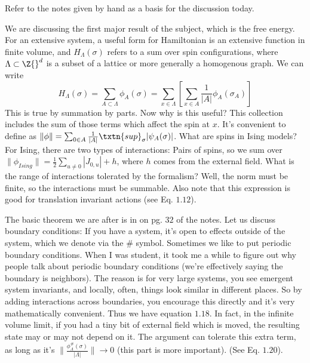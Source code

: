
Refer to the notes given by hand as a basis for the discussion today. 

We are discussing the first major result of the subject, which is the free energy. For an extensive system, a useful form for Hamiltonian is an extensive function in finite volume, and $H_{\Lambda}(\sigma)$ refers to a sum over spin configurations, where $\Lambda \subset \Z{}^d$ is a subset of a lattice or more generally a homogenous graph. We can write 
\[
H_{\Lambda}(\sigma) = \sum_{A \subset \Lambda} \phi_A(\sigma) = \sum_{x \in \Lambda}\left[\sum_{x \in A} \frac{1}{|A|}\phi_A(\sigma_A)\right]
\]
This is true by summation by parts.  Now why is this useful? This collection includes the sum of those terms which affect the spin at $x$. It's convenient to define as $\| \phi \| = \sum_{0 \in A} \frac{1}{|A|} \txtn{sup}_{\sigma} |\psi_A(\sigma)|$. What are spins in Ising models? For Ising, there are two types of interactions: Pairs of spins, so we sum over $\|\phi_{Ising}\| = \frac{1}{2}\sum_{u \neq 0} |J_{0, u}| + h$, where $h$ comes from the external field. What is the range of interactions tolerated by the formalism? Well, the norm must be finite, so the interactions must be summable. 
Also note that this expression is good for translation invariant actions (see Eq. $1.12$). 

The basic theorem we are after is in on pg. $32$ of the notes. Let us discuss boundary conditions: If you have a system, it's open to effects outside of the system, which we denote via the $\#$ symbol. Sometimes we like to put periodic boundary conditions. When I was student, it took me a while to figure out why people talk about periodic boundary conditions (we're effectively saying the boundary is neighbors). The reason is for very large systems, you see emergent system invariants, and locally, often, things look similar in different places. So by adding interactions across boundaries, you encourage this directly and it's very mathematically convenient. Thus we have equation $1.18$. In fact, in the infinite volume limit, if you had a tiny bit of external field which is moved, the resulting state may or may not depend on it. The argument can tolerate this extra term, as long as it's $ \|\frac{\phi_{\Lambda}^{\#}(\sigma)}{|\Lambda|}\| \to 0$ (this part is more important). (See Eq. $1.20$). 

